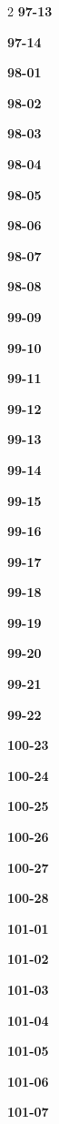 \documentclass[10pt,a4paper]{article}
\begin{document}
\begin{multicols}{2}
\noindent\textbf{97-13}\ \par
\noindent\textbf{97-14}\ \par
\noindent\textbf{98-01}\ \par
\noindent\textbf{98-02}\ \par
\noindent\textbf{98-03}\ \par
\noindent\textbf{98-04}\ \par
\noindent\textbf{98-05}\ \par
\noindent\textbf{98-06}\ \par
\noindent\textbf{98-07}\ \par
\noindent\textbf{98-08}\ \par
\noindent\textbf{99-09}\ \par
\noindent\textbf{99-10}\ \par
\noindent\textbf{99-11}\ \par
\noindent\textbf{99-12}\ \par
\noindent\textbf{99-13}\ \par
\noindent\textbf{99-14}\ \par
\noindent\textbf{99-15}\ \par
\noindent\textbf{99-16}\ \par
\noindent\textbf{99-17}\ \par
\noindent\textbf{99-18}\ \par
\noindent\textbf{99-19}\ \par
\noindent\textbf{99-20}\ \par
\noindent\textbf{99-21}\ \par
\noindent\textbf{99-22}\ \par
\noindent\textbf{100-23}\ \par
\noindent\textbf{100-24}\ \par
\noindent\textbf{100-25}\ \par
\noindent\textbf{100-26}\ \par
\noindent\textbf{100-27}\ \par
\noindent\textbf{100-28}\ \par
\noindent\textbf{101-01}\ \par
\noindent\textbf{101-02}\ \par
\noindent\textbf{101-03}\ \par
\noindent\textbf{101-04}\ \par
\noindent\textbf{101-05}\ \par
\noindent\textbf{101-06}\ \par
\noindent\textbf{101-07}\ \par

\end{multicols}
\end{document}
